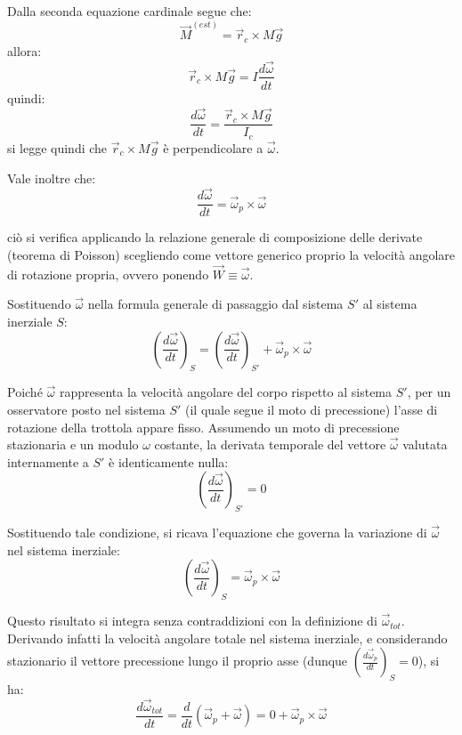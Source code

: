 \documentclass[11pt, a4paper, openright]{book}
\theoremstyle{plain}
\theoremstyle{definition}
\begin{document}
Dalla seconda equazione cardinale segue che:
\begin{equation}
    \vec{M}^{(est)} = \vec{r}_c \times M\vec{g}
\end{equation}
allora:
\begin{equation}
    \vec{r}_c \times M\vec{g} = I\frac{d\vec{\omega}}{dt}
\end{equation}
quindi:
\begin{equation}
    \frac{d\vec{\omega}}{dt} = \frac{\vec{r}_c \times M\vec{g}}{I_c}
\end{equation}
si legge quindi che $\vec{r}_c \times M\vec{g}$ è perpendicolare a $\vec{\omega}$.

Vale inoltre che:
\begin{equation}
    \frac{d\vec{\omega}}{dt} = \vec{\omega}_p \times \vec{\omega}
\end{equation}

ciò si verifica applicando la relazione generale di composizione delle derivate (teorema di Poisson) scegliendo come vettore generico proprio la velocità angolare di rotazione propria, ovvero ponendo $\vec{W} \equiv \vec{\omega}$.

Sostituendo $\vec{\omega}$ nella formula generale di passaggio dal sistema $S'$ al sistema inerziale $S$:
\begin{equation}
    \left(\frac{d\vec{\omega}}{dt}\right)_S = \left(\frac{d\vec{\omega}}{dt}\right)_{S'} + \vec{\omega}_p \times \vec{\omega}
\end{equation}

Poiché $\vec{\omega}$ rappresenta la velocità angolare del corpo rispetto al sistema $S'$, per un osservatore posto nel sistema $S'$ (il quale segue il moto di precessione) l'asse di rotazione della trottola appare fisso. Assumendo un moto di precessione stazionaria e un modulo $\omega$ costante, la derivata temporale del vettore $\vec{\omega}$ valutata internamente a $S'$ è identicamente nulla:
\begin{equation}
    \left(\frac{d\vec{\omega}}{dt}\right)_{S'} = 0
\end{equation}

Sostituendo tale condizione, si ricava l'equazione che governa la variazione di $\vec{\omega}$ nel sistema inerziale:
\begin{equation}
    \left(\frac{d\vec{\omega}}{dt}\right)_S = \vec{\omega}_p \times \vec{\omega}
\end{equation}

Questo risultato si integra senza contraddizioni con la definizione di $\vec{\omega}_{tot}$. Derivando infatti la velocità angolare totale nel sistema inerziale, e considerando stazionario il vettore precessione lungo il proprio asse (dunque $\left(\frac{d\vec{\omega}_p}{dt}\right)_S = 0$), si ha:
\begin{equation}
    \frac{d\vec{\omega}_{tot}}{dt} = \frac{d}{dt}(\vec{\omega}_p + \vec{\omega}) = 0 + \vec{\omega}_p \times \vec{\omega}
\end{equation}
\end{document}
